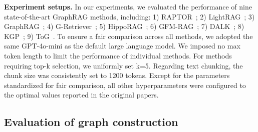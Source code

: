 \documentclass{article}
\begin{document}
\textbf{Experiment setups.} In our experiments, we evaluated the performance of nine state-of-the-art GraphRAG methods, including: 1) RAPTOR~\cite{raptor}; 2) LightRAG~\cite{lightrag}; 3) GraphRAG~\cite{graphrag}; 4) G-Retriever~\cite{G-Retriever}; 5) HippoRAG~\cite{hippo}; 6) GFM-RAG~\cite{GFM}; 7) DALK~\cite{dalk}; 8) KGP~\cite{KGP}; 9) ToG~\cite{TOG}. To ensure a fair comparison across all methods, we adopted the same GPT-4o-mini as the default large language model. We imposed no max token length to limit the performance of individual methods. For methods requiring top-k selection, we uniformly set k=5. Regarding text chunking, the chunk size was consistently set to 1200 tokens. Except for the parameters standardized for fair comparison, all other hyperparameters were configured to the optimal values reported in the original papers. 
\subsection{Evaluation of graph construction}
\end{document}
